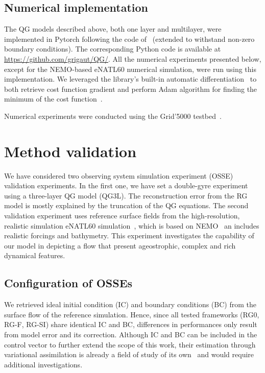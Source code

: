 \documentclass[
  draft
]{agujournal2025}
\begin{document}
\subsection{Numerical implementation}
The QG models described above, both one layer and multilayer, were implemented in Pytorch following the code of~ (extended to withstand non-zero boundary conditions). The corresponding Python code is available at \url{https://github.com/grigaut/QG/}.
All the numerical experiments presented below, except for the NEMO-based eNATL60 numerical simulation, were run using this implementation. 
We leveraged the library's built-in automatic differentiation~\cite{paszke2017} to both retrieve cost function gradient and perform Adam algorithm for finding the minimum of the cost function~\cite{kingma2017}.

Numerical experiments were conducted using the Grid'5000 testbed~\cite{balouek2013}.

\section{Method validation}\label{sec:method-validation}

We have considered two observing system simulation experiment (OSSE) validation experiments. In the first one, we have set a double-gyre experiment using a three-layer QG model (QG3L). The reconstruction error from the RG model is mostly explained by the truncation of the QG equations. The second validation experiment uses reference surface fields from the high-resolution, realistic simulation eNATL60 simulation~\cite{brodeau2020}, which is based on NEMO~\cite{madec2024} an includes realistic forcings and bathymetry. This experiment investigates the capability of our model in depicting a flow that present ageostrophic, complex and rich dynamical features.

\subsection{Configuration of OSSEs}

We retrieved ideal initial condition (IC) and boundary conditions (BC) from the surface flow of the reference simulation. Hence, since all tested frameworks (RG0, RG-F, RG-SI) share identical IC and BC, differences in performances only result from model error and its correction. Although IC and BC can be included in the control vector to further extend the scope of this work, their estimation through variational assimilation is already a field of study of its own~\cite{cong1998,zou1995,gunson1996,seiler1993,ayoub2006} and would require additional investigations.
\end{document}
